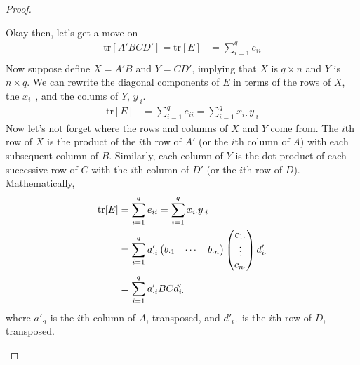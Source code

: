 \documentclass[12pt]{article}
\theoremstyle{plain}
\theoremstyle{definition}
\theoremstyle{remark}
\begin{document}
\begin{proof}
\begin{enumerate}[label=(\roman*)]
    Okay then, let's get a move on
    \begin{align*}
        \text{tr}[A'BCD'] = \text{tr}[E] &=
      \sum^q_{i=1} e_{ii} \\
    \end{align*}
    Now suppose define $X = A'B$ and $Y = CD'$, implying
    that $X$ is $q\times n$ and $Y$ is $n\times q$.
    We can rewrite the diagonal components of $E$ in
    terms of the rows of $X$, the $x_{i\cdot}$, and
    the colums of $Y$, $y_{\cdot i}$.
    \begin{align*}
        \text{tr}[E] &=
      \sum^q_{i=1} e_{ii}
      = \sum^q_{i=1} x_{i\cdot} y_{\cdot i}
    \end{align*}
    Now let's not forget where the rows and columns of
    $X$ and $Y$ come from. The $i$th row of $X$ is
    the product of the $i$th row of $A'$ (or the $i$th
    column of $A$) with
    each subsequent column of $B$. Similarly, each
    column of $Y$ is the dot product of each
    successive row of $C$ with the $i$th column of $D'$
    (or the $i$th row of $D$).
    Mathematically,
    \begin{align}
        \text{tr}[E] &=
      \sum^q_{i=1} e_{ii}
      = \sum^q_{i=1} x_{i\cdot} y_{\cdot i} \notag \\
        &= \sum^q_{i=1} a'_{\cdot i}
      \begin{pmatrix} b_{\cdot 1} & \cdots & b_{\cdot n}
      \end{pmatrix}
      \begin{pmatrix} c_{1\cdot} \\ \vdots \\ c_{n \cdot}
      \end{pmatrix}
      d'_{i \cdot} \label{fullrep} \\
        &= \sum^q_{i=1} a'_{\cdot i}
      BC
      d'_{i \cdot} \label{simprep}
    \end{align}
    where $a'_{\cdot i}$ is the $i$th column of $A$,
    transposed, and $d'_{i \cdot}$ is the $i$th row of $D$,
    transposed.


\end{enumerate}
\end{proof}
\end{document}
